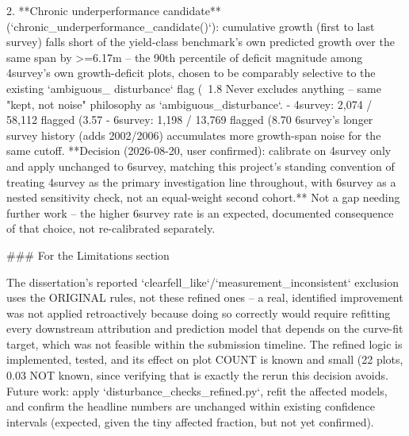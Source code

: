 2. **Chronic underperformance candidate** (`chronic_underperformance_candidate()`): cumulative
   growth (first to last survey) falls short of the yield-class benchmark's own predicted growth
   over the same span by >=6.17m -- the 90th percentile of deficit magnitude among 4survey's own
   growth-deficit plots, chosen to be comparably selective to the existing `ambiguous_
   disturbance` flag (~1.8%
   Never excludes anything -- same "kept, not noise" philosophy as `ambiguous_disturbance`.
   - 4survey: 2,074 / 58,112 flagged (3.57%
   - 6survey: 1,198 / 13,769 flagged (8.70%
     6survey's longer survey history (adds 2002/2006) accumulates more growth-span noise for the
     same cutoff. **Decision (2026-08-20, user confirmed): calibrate on 4survey only and apply
     unchanged to 6survey, matching this project's standing convention of treating 4survey as
     the primary investigation line throughout, with 6survey as a nested sensitivity check, not
     an equal-weight second cohort.** Not a gap needing further work -- the higher 6survey rate
     is an expected, documented consequence of that choice, not re-calibrated separately.

### For the Limitations section

The dissertation's reported `clearfell_like`/`measurement_inconsistent` exclusion uses the
ORIGINAL rules, not these refined ones -- a real, identified improvement was not applied
retroactively because doing so correctly would require refitting every downstream attribution
and prediction model that depends on the curve-fit target, which was not feasible within the
submission timeline. The refined logic is implemented, tested, and its effect on plot COUNT is
known and small (22 plots, 0.03%
NOT known, since verifying that is exactly the rerun this decision avoids. Future work: apply
`disturbance_checks_refined.py`, refit the affected models, and confirm the headline numbers are
unchanged within existing confidence intervals (expected, given the tiny affected fraction, but
not yet confirmed).
